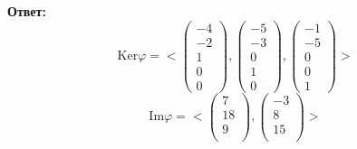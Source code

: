 \documentclass[a4paper,12pt]{article}
\begin{document}
{\Large \begin{center}
\textbf{Ответ: } 
\[
\text{Ker} \varphi = 
<
\begin{pmatrix}
-4 \\ -2 \\ 1 \\ 0 \\ 0
\end{pmatrix}
,
\begin{pmatrix}
-5 \\ -3 \\ 0 \\ 1 \\ 0
\end{pmatrix}
,
\begin{pmatrix}
-1 \\ -5 \\ 0 \\ 0 \\ 1
\end{pmatrix}
>
\]
\[
\text{Im} \varphi = 
<
\left(\begin{matrix}
7 \\
18\\
9\\
\end{matrix}\right)
,
\left(\begin{matrix}
-3\\
8 \\
15 \\
\end{matrix}\right)
>
\]
\end{center}}
\clearpage
\end{document}
